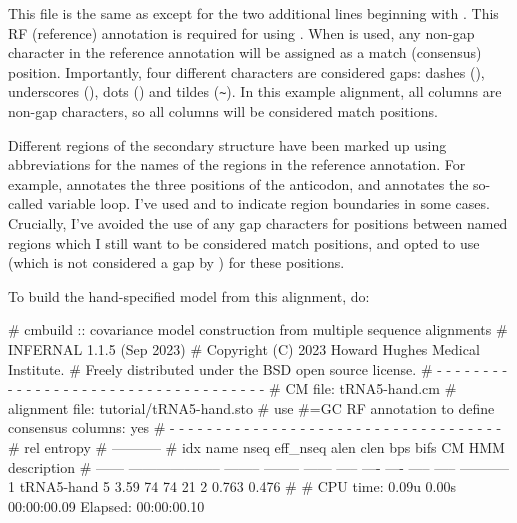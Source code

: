 This file is the same as  except for the two
additional lines beginning with . This RF (reference)
annotation is required for using . When 
is used, any non-gap character in the reference annotation will be
assigned as a match (consensus) position. Importantly, four different
characters are considered gaps: dashes (\otext{-}), underscores
(\otext{\_}), dots () and tildes (\verb+~+). In this example
alignment, all columns are non-gap characters, so all columns will be
considered match positions.

Different regions of the secondary structure have been marked up using
abbreviations for the names of the regions in the reference
annotation. For example,  annotates the three positions of
the anticodon, and \otext{[vlp]} annotates the so-called variable
loop. I've used \otext{[} and \otext{]} to indicate region boundaries
in some cases. Crucially, I've avoided the use of any gap characters
for positions between named regions which I still want to be
considered match positions, and opted to use \otext{=} (which is not
considered a gap by ) for these positions.

To build the hand-specified model from this alignment, do:


\begin{sreoutput}
# cmbuild :: covariance model construction from multiple sequence alignments
# INFERNAL 1.1.5 (Sep 2023)
# Copyright (C) 2023 Howard Hughes Medical Institute.
# Freely distributed under the BSD open source license.
# - - - - - - - - - - - - - - - - - - - - - - - - - - - - - - - - - - - -
# CM file:                                            tRNA5-hand.cm
# alignment file:                                     tutorial/tRNA5-hand.sto
# use #=GC RF annotation to define consensus columns: yes
# - - - - - - - - - - - - - - - - - - - - - - - - - - - - - - - - - - - -
#                                                                      rel entropy
#                                                                      -----------
# idx    name                     nseq eff_nseq   alen  clen  bps bifs    CM   HMM description
# ------ -------------------- -------- -------- ------ ----- ---- ---- ----- ----- -----------
       1 tRNA5-hand                  5     3.59     74    74   21    2 0.763 0.476 
#
# CPU time: 0.09u 0.00s 00:00:00.09 Elapsed: 00:00:00.10
\end{sreoutput}

